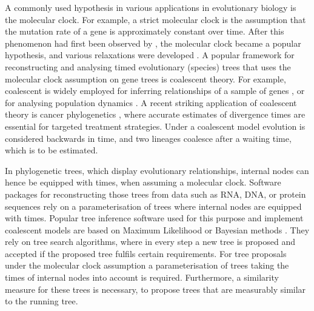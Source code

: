 \documentclass[11pt]{amsart}
\newcommand{\summary}[1]{} %
\begin{document}
\summary{Molecular clock, divergence dating, and coalescent -- biological motivation}
A commonly used hypothesis in various applications in evolutionary biology is the molecular clock.
For example, a strict molecular clock is the assumption that the mutation rate of a gene is approximately constant over time.
After this phenomenon had first been observed by \textcite{zuckerkandl1965evolutionary}, the molecular clock became a popular hypothesis, and various relaxations were developed \autocite{Kumar2016-eu}.
A popular framework for reconstructing and analysing timed evolutionary (species) trees \autocite{Kingman1982-df} that uses the molecular clock assumption on gene trees is coalescent theory.
For example, coalescent is widely employed for inferring relationships of a sample of genes \autocite{Hudson1990-ki, Kuhner2009-jb}, or for analysing population dynamics \autocite{Kuhner1998-eh,Drummond2005-ak}.
A recent striking application of coalescent theory is cancer phylogenetics \autocite{Posada2020-aa, Ohtsuki2017-su}, where accurate estimates of divergence times are essential for targeted treatment strategies.
Under a coalescent model evolution is considered backwards in time, and two lineages coalesce after a waiting time, which is to be estimated.

\summary{Software needs to deal with clock trees, tree proposals}
In phylogenetic trees, which display evolutionary relationships, internal nodes can hence be equipped with times, when assuming a molecular clock.
Software packages for reconstructing those trees from data such as RNA, DNA, or protein sequences rely on a parameterisation of trees where internal nodes are equipped with times.
Popular tree inference software used for this purpose and implement coalescent models are based on Maximum Likelihood \autocite{Kozlov2019-cf, Nguyen2015-sp, Tamura2011-ky} or Bayesian methods \autocite{Bouckaert2014-ir,Suchard2018-tw, Ronquist2003-eq}.
They rely on tree search algorithms, where in every step a new tree is proposed and accepted if the proposed tree fulfils certain requirements.
For tree proposals under the molecular clock assumption a parameterisation of trees taking the times of internal nodes into account is required.
Furthermore, a similarity measure for these trees is necessary, to propose trees that are measurably similar to the running tree.
\end{document}
